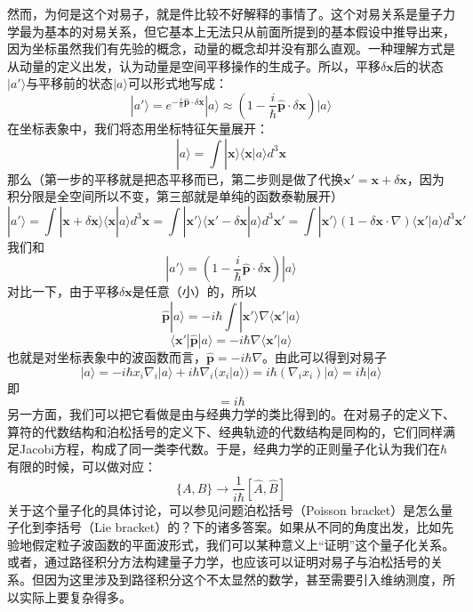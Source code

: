 \documentclass{ctexart}
\begin{document}
然而，为何是这个对易子，就是件比较不好解释的事情了。这个对易关系是量子力学最为基本的对易关系，但它基本上无法只从前面所提到的基本假设中推导出来，因为坐标虽然我们有先验的概念，动量的概念却并没有那么直观。一种理解方式是从动量的定义出发，认为动量是空间平移操作的生成子。所以，平移$\delta\bm{x}$后的状态$|a'\rangle$与平移前的状态$|a\rangle$可以形式地写成：
\begin{equation}
|a'\rangle=e^{-\frac{i}{\hbar}\hat{\bm{p}}\cdot \delta\bm{x}}|a\rangle\approx(1-\frac{i}{\hbar}\hat{\bm{p}}\cdot \delta\bm{x})|a\rangle
\end{equation}
在坐标表象中，我们将态用坐标特征矢量展开：
\begin{equation}
|a\rangle=\int|\bm{x}\rangle\langle \bm{x}|a\rangle d^3\bm{x}
\end{equation}
那么（第一步的平移就是把态平移而已，第二步则是做了代换$\bm{x}'=\bm{x}+\delta \bm{x}$，因为积分限是全空间所以不变，第三部就是单纯的函数泰勒展开）
\begin{equation}
|a'\rangle=\int|\bm{x}+\delta\bm{x}\rangle\langle \bm{x}|a\rangle d^3\bm{x}=\int|\bm{x}'\rangle\langle \bm{x}'-\delta\bm{x}|a\rangle d^3\bm{x}'=\int|\bm{x}'\rangle(1-\delta\bm{x}\cdot\nabla)\langle \bm{x}'|a\rangle d^3\bm{x}'
\end{equation}
我们和
\begin{equation}
|a'\rangle=(1-\frac{i}{\hbar}\hat{\bm{p}}\cdot \delta\bm{x})|a\rangle
\end{equation}
对比一下，由于平移$\delta\bm{x}$是任意（小）的，所以
\begin{equation}
\hat{\bm{p}}|a\rangle=-i\hbar\int|\bm{x}'\rangle\nabla\langle\bm{x}'|a\rangle
\end{equation}
\begin{equation}
\langle\bm{x}'|\hat{\bm{p}}|a\rangle=-i\hbar\nabla\langle\bm{x}'|a\rangle
\end{equation}
也就是对坐标表象中的波函数而言，$\hat{\bm{p}}=-i\hbar\nabla$。由此可以得到对易子
\begin{equation}
[\hat{x}_i,\hat{p}_i]|a\rangle=-i\hbar x_i\nabla_i|a\rangle+i\hbar\nabla_i(x_i|a\rangle)=i\hbar (\nabla_ix_i)|a\rangle=i\hbar|a\rangle
\end{equation}
即
\begin{equation}
[\hat{x},\hat{p}]=i\hbar
\end{equation}
另一方面，我们可以把它看做是由与经典力学的类比得到的。在对易子的定义下、算符的代数结构和泊松括号的定义下、经典轨迹的代数结构是同构的，它们同样满足Jacobi方程，构成了同一类李代数。于是，经典力学的正则量子化认为我们在$\hbar$有限的时候，可以做对应：
\begin{equation}
\{A,B\}\to \frac{1}{i\hbar}[\hat{A},\hat{B}]
\end{equation}
关于这个量子化的具体讨论，可以参见问题泊松括号（Poisson bracket）是怎么量子化到李括号（Lie bracket）的？下的诸多答案。如果从不同的角度出发，比如先验地假定粒子波函数的平面波形式，我们可以某种意义上“证明”这个量子化关系。或者，通过路径积分方法构建量子力学，也应该可以证明对易子与泊松括号的关系。但因为这里涉及到路径积分这个不太显然的数学，甚至需要引入维纳测度，所以实际上要复杂得多。
\end{document}
